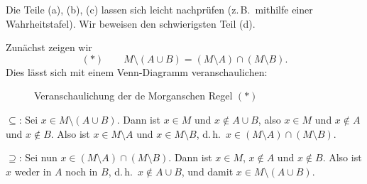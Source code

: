 \documentclass[a4paper]{article}
\makeatletter
\theoremstyle{kurzskript}
\renewenvironment{proof}[1][\proofname]{\par\pushQED{\qed}%
  \normalfont\topsep\medskipamount\relax
  \trivlist\item[\hskip\labelsep\bfseries #1\@addpunct{.}]\ignorespaces}%
  {\popQED\endtrivlist\@endpefalse}
\renewcommand{\proofname}{Beweis}
\makeatother
\begin{document}
\begin{proof}
Die Teile (a), (b), (c) lassen sich \glqq leicht\grqq{} nachprüfen (z.\,B.\ mithilfe einer Wahrheitstafel). Wir beweisen den schwierigsten Teil (d).

Zunächst zeigen wir
\[
  (*) \qquad M \setminus (A \cup B) = (M \setminus A) \cap (M \setminus B).
\]
Dies lässt sich mit einem Venn-Diagramm veranschaulichen:

\begin{figure}[H]
\centering
{}
\caption{Veranschaulichung der de Morganschen Regel $(*)$}
\end{figure}

\glqq$\subseteq$\grqq: Sei $x \in M \setminus (A \cup B)$. Dann ist $x \in M$ und $x \notin A \cup B$, also $x \in M$ und $x \notin A$ und $x \notin B$. Also ist $x \in M \setminus A$ und $x \in M \setminus B$, d.\,h.\ $x \in (M \setminus A) \cap (M \setminus B)$.

\glqq$\supseteq$\grqq: Sei nun $x \in (M \setminus A) \cap (M \setminus B)$. Dann ist $x \in M$, $x \notin A$ und $x \notin B$. Also ist $x$ weder in $A$ noch in $B$, d.\,h.\ $x \notin A \cup B$, und damit $x \in M \setminus (A \cup B)$.


\end{proof}
\end{document}
